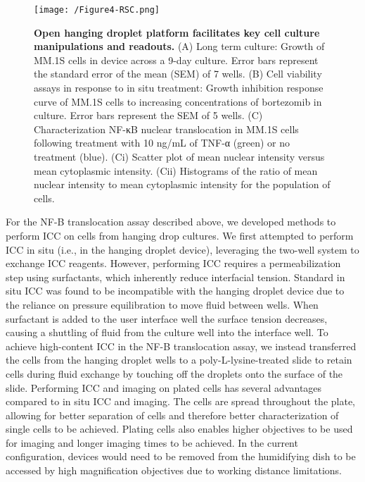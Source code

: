 \begin{figure}[h!] %
\centering
\texttt{[image: /Figure4-RSC.png]}
\caption[\textbf{Open hanging droplet platform facilitates key cell culture manipulations and readouts.}]{\textbf{Open hanging droplet platform facilitates key cell culture manipulations and readouts.} (A) Long term culture: Growth of MM.1S cells in device across a 9-day culture. Error bars represent the standard error of the mean (SEM) of 7 wells. (B) Cell viability assays in response to in situ treatment: Growth inhibition response curve of MM.1S cells to increasing concentrations of bortezomib in culture. Error bars represent the SEM of 5 wells. (C) Characterization NF-κB nuclear translocation in MM.1S cells following treatment with 10 ng/mL of TNF-α (green) or no treatment (blue). (Ci) Scatter plot of mean nuclear intensity versus mean cytoplasmic intensity. (Cii) Histograms of the ratio of mean nuclear intensity to mean cytoplasmic intensity for the population of cells.}
\label{figure:Fig4}
\end{figure}

For the NF-\textkappa B translocation assay described above, we developed methods to perform ICC on cells from hanging drop cultures. We first attempted to perform ICC in situ (i.e., in the hanging droplet device), leveraging the two-well system to exchange ICC reagents. However, performing ICC requires a permeabilization step using surfactants, which inherently reduce interfacial tension. Standard in situ ICC was found to be incompatible with the hanging droplet device due to the reliance on pressure equilibration to move fluid between wells. When surfactant is added to the user interface well  the surface tension decreases, causing a shuttling of fluid from the culture well into the interface well. To achieve high-content ICC in the NF-\textkappa B translocation assay, we instead transferred the cells from the hanging droplet wells to a poly-L-lysine-treated slide to retain cells during fluid exchange by touching off the droplets onto the surface of the slide.  Performing ICC and imaging on plated cells has several advantages compared to in situ ICC and imaging. The cells are spread throughout the plate, allowing for better separation of cells and therefore better characterization of single cells to be achieved. Plating cells also enables higher objectives to be used for imaging and longer imaging times to be achieved. In the current configuration, devices would need to be removed from the humidifying dish to be accessed by high magnification objectives due to working distance limitations. 

